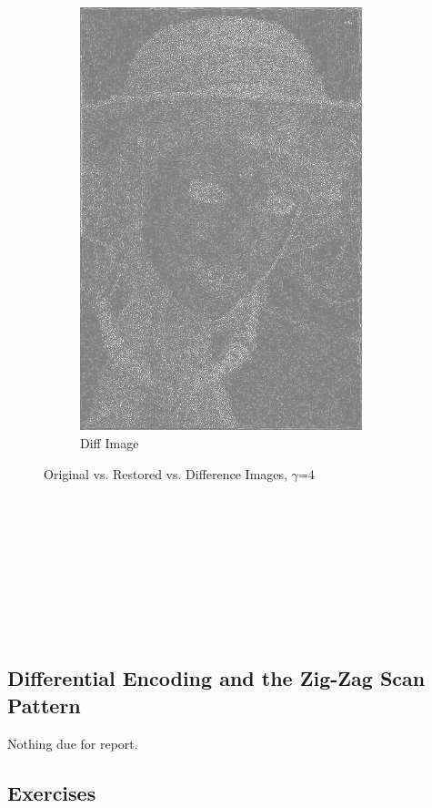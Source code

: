 \documentclass{article}
\begin{document}
\begin{figure}[!htb]
\begin{subfigure}{0.3\textwidth}
					\includegraphics[width=0.9\textwidth]{img03y_diff_2.png}
					\caption{Diff Image}
				\end{subfigure}
				\caption{Original vs. Restored vs. Difference Images, $\gamma$=4}
			\end{figure}
			\\
			\\
			\\
			\\
			\\
			\\
			\\
			\\
	\subsection{Differential Encoding and the Zig-Zag Scan Pattern}
		Nothing due for report.
	\subsection{Exercises}
\end{document}
